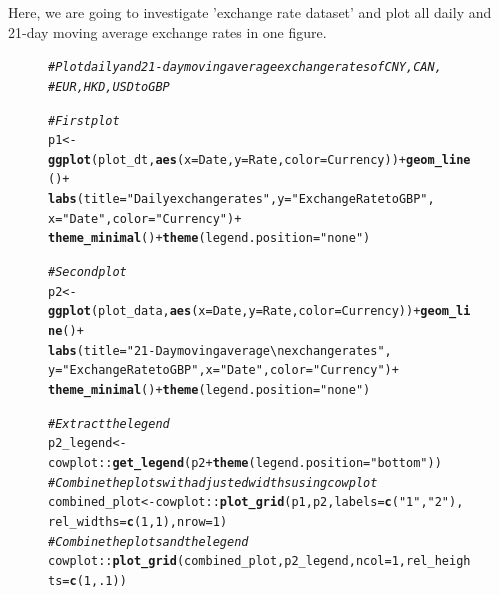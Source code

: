 \documentclass{article}\usepackage[]{graphicx}\usepackage[]{xcolor}
\makeatletter
\newcommand{\hlnum}[1]{\textcolor[rgb]{0.686,0.059,0.569}{#1}}%
\newcommand{\hlstr}[1]{\textcolor[rgb]{0.192,0.494,0.8}{#1}}%
\newcommand{\hlcom}[1]{\textcolor[rgb]{0.678,0.584,0.686}{\textit{#1}}}%
\newcommand{\hlopt}[1]{\textcolor[rgb]{0,0,0}{#1}}%
\newcommand{\hlstd}[1]{\textcolor[rgb]{0.345,0.345,0.345}{#1}}%
\newcommand{\hlkwb}[1]{\textcolor[rgb]{0.69,0.353,0.396}{#1}}%
\newcommand{\hlkwc}[1]{\textcolor[rgb]{0.333,0.667,0.333}{#1}}%
\newcommand{\hlkwd}[1]{\textcolor[rgb]{0.737,0.353,0.396}{\textbf{#1}}}%
\newenvironment{kframe}{%
 \def\at@end@of@kframe{}%
 \ifinner\ifhmode%
  \def\at@end@of@kframe{\end{minipage}}%
  \begin{minipage}{\columnwidth}%
 \fi\fi%
 \def\FrameCommand##1{\hskip\@totalleftmargin \hskip-\fboxsep
 \colorbox{shadecolor}{##1}\hskip-\fboxsep
     \hskip-\linewidth \hskip-\@totalleftmargin \hskip\columnwidth}%
 \MakeFramed {\advance\hsize-\width
   \@totalleftmargin\z@ \linewidth\hsize
   \@setminipage}}%
 {\par\unskip\endMakeFramed%
 \at@end@of@kframe}
\newenvironment{knitrout}{}{} %
\makeatother
\begin{document}
Here, we are going to investigate 'exchange rate dataset' and plot all daily and 21-day moving average exchange rates in one figure.

\begin{figure}[H]
\begin{knitrout}\scriptsize
{}\color{fgcolor}\begin{kframe}
\begin{alltt}
\hlcom{# Plot daily and 21-day moving average exchange rates of CNY, CAN,}
\hlcom{# EUR, HKD, USD to GBP}

\hlcom{# First plot}
\hlstd{p1} \hlkwb{<-} \hlkwd{ggplot}\hlstd{(plot_dt,} \hlkwd{aes}\hlstd{(}\hlkwc{x}\hlstd{=Date,} \hlkwc{y}\hlstd{=Rate,} \hlkwc{color}\hlstd{=Currency))} \hlopt{+} \hlkwd{geom_line}\hlstd{()} \hlopt{+}
  \hlkwd{labs}\hlstd{(}\hlkwc{title}\hlstd{=}\hlstr{"Daily exchange rates"}\hlstd{,} \hlkwc{y}\hlstd{=}\hlstr{"Exchange Rate to GBP"}\hlstd{,}
       \hlkwc{x}\hlstd{=}\hlstr{"Date"}\hlstd{,} \hlkwc{color}\hlstd{=}\hlstr{"Currency"}\hlstd{)}\hlopt{+}
  \hlkwd{theme_minimal}\hlstd{()} \hlopt{+} \hlkwd{theme}\hlstd{(}\hlkwc{legend.position}\hlstd{=}\hlstr{"none"}\hlstd{)}

\hlcom{# Second plot}
\hlstd{p2} \hlkwb{<-} \hlkwd{ggplot}\hlstd{(plot_data,} \hlkwd{aes}\hlstd{(}\hlkwc{x}\hlstd{=Date,} \hlkwc{y}\hlstd{=Rate,} \hlkwc{color}\hlstd{=Currency))} \hlopt{+} \hlkwd{geom_line}\hlstd{()} \hlopt{+}
  \hlkwd{labs}\hlstd{(}\hlkwc{title}\hlstd{=}\hlstr{"21-Day moving average \textbackslash{}n exchange rates"}\hlstd{,}
       \hlkwc{y}\hlstd{=}\hlstr{"Exchange Rate to GBP"}\hlstd{,} \hlkwc{x}\hlstd{=}\hlstr{"Date"}\hlstd{,} \hlkwc{color}\hlstd{=}\hlstr{"Currency"}\hlstd{)}\hlopt{+}
  \hlkwd{theme_minimal}\hlstd{()} \hlopt{+} \hlkwd{theme}\hlstd{(}\hlkwc{legend.position}\hlstd{=}\hlstr{"none"}\hlstd{)}

\hlcom{# Extract the legend}
\hlstd{p2_legend} \hlkwb{<-} \hlstd{cowplot}\hlopt{::}\hlkwd{get_legend}\hlstd{(p2} \hlopt{+} \hlkwd{theme}\hlstd{(}\hlkwc{legend.position}\hlstd{=}\hlstr{"bottom"}\hlstd{))}
\hlcom{# Combine the plots with adjusted widths using cowplot}
\hlstd{combined_plot} \hlkwb{<-} \hlstd{cowplot}\hlopt{::}\hlkwd{plot_grid}\hlstd{(p1, p2,} \hlkwc{labels} \hlstd{=} \hlkwd{c}\hlstd{(}\hlstr{"1"}\hlstd{,} \hlstr{"2"}\hlstd{),}
                                    \hlkwc{rel_widths} \hlstd{=} \hlkwd{c}\hlstd{(}\hlnum{1}\hlstd{,} \hlnum{1}\hlstd{),} \hlkwc{nrow}\hlstd{=}\hlnum{1}\hlstd{)}
\hlcom{# Combine the plots and the legend}
\hlstd{cowplot}\hlopt{::}\hlkwd{plot_grid}\hlstd{(combined_plot, p2_legend,} \hlkwc{ncol}\hlstd{=}\hlnum{1}\hlstd{,} \hlkwc{rel_heights} \hlstd{=} \hlkwd{c}\hlstd{(}\hlnum{1}\hlstd{,} \hlnum{.1}\hlstd{))}
\end{alltt}
\end{kframe}


\end{knitrout}
\end{figure}
\end{document}
